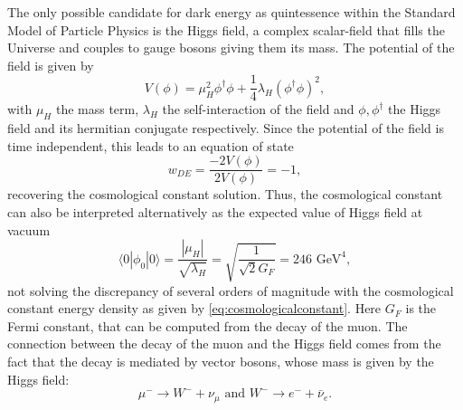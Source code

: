 The only possible candidate for dark energy as quintessence within the Standard Model of Particle Physics is the Higgs field, a complex scalar-field that fills the Universe and couples to gauge bosons giving them its mass. The potential of the field is given by
\begin{equation}
V(\phi) = \mu_H^2\phi^\dagger\phi+\frac{1}{4}\lambda_H(\phi^\dagger\phi)^2,
\end{equation}
with $\mu_H$ the mass term, $\lambda_H$ the self-interaction of the field and $\phi,\phi^\dagger$ the Higgs field and its hermitian conjugate respectively. Since the potential of the field is time independent, this leads to an equation of state
\begin{equation}
w_{DE} = \frac{-2V(\phi)}{2V(\phi)} = -1,
\end{equation}
recovering the cosmological constant solution. Thus, the cosmological constant can also be interpreted alternatively as the expected value of Higgs field at vacuum
\begin{equation}
\langle 0|\phi_0|0\rangle = \frac{|\mu_H|}{\sqrt{\lambda_H}}= \sqrt{\frac{1}{\sqrt{2}G_F}}= 246\mbox{ GeV}^4,
\end{equation}
not solving the discrepancy of several orders of magnitude with the cosmological constant energy density as given by \autoref{eq:cosmologicalconstant}. Here $G_F$ is the Fermi constant, that can be computed from the decay of the muon. The connection between the decay of the muon and the Higgs field comes from the fact that the decay is mediated by vector bosons, whose mass is given by the Higgs field:
\begin{equation}
\mu^- \rightarrow W^- + \nu_\mu \mbox{ and }W^-\rightarrow e^-+\bar\nu_e.
\end{equation}
\newline

